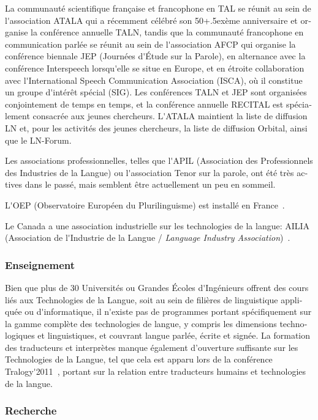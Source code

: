 \documentclass[]{../metanetpaper}
\begin{document}
\begin{french}
\begin{multicols}{2}
La communauté scientifique française et francophone en TAL se réunit
au sein de l{\mbox '}association ATALA qui a récemment célébré son
50\raise+.5ex\hbox{ème} anniversaire et organise la conférence
annuelle TALN, tandis que la communauté francophone en communication
parlée se réunit au sein de l{\mbox '}association AFCP qui organise la
conférence biennale JEP (Journées d{\mbox '}Étude sur la Parole), en
alternance avec la conférence Interspeech lorsqu{\mbox '}elle se situe en
Europe, et en étroite collaboration avec l{\mbox '}International Speech
Communication Association (ISCA), où il constitue un groupe d{\mbox '}intérêt
spécial (SIG). Les conférences TALN et JEP sont organisées
conjointement de temps en temps, et la conférence annuelle RECITAL est
spécialement consacrée aux jeunes chercheurs. L{\mbox '}ATALA maintient la
liste de diffusion LN et, pour les activités des jeunes chercheurs, la
liste de diffusion Orbital, ainsi que le LN-Forum.

Les associations professionnelles, telles que l{\mbox '}APIL (Association des
Professionnels des Industries de la Langue) ou l{\mbox '}association Tenor sur
la parole, ont été très actives dans le passé, mais semblent être
actuellement un peu en sommeil.

L{\mbox '}OEP (Observatoire Européen du Plurilinguisme) est installé en France~\cite{OEP}.

Le Canada a une association industrielle sur les technologies de la langue: AILIA
(Association de l{\mbox '}Industrie de la Langue / {\em Language Industry
Association})~\cite{ailia}.

\subsubsection{Enseignement}
Bien que plus de 30 Universités ou Grandes Écoles d{\mbox '}Ingénieurs
offrent des cours liés aux Technologies de la Langue, soit au sein de
filières de linguistique appliquée ou d{\mbox '}informatique, il
n{\mbox '}existe pas de programmes portant spécifiquement sur la gamme
complète des technologies de langue, y compris les dimensions
technologiques et linguistiques, et couvrant langue parlée, écrite et
signée. La formation des traducteurs et interprètes manque également
d'ouverture suffisante sur les Technologies de la Langue, tel que cela
est apparu lors de la conférence Tralogy{\mbox '}2011~\cite{tralogy},
portant sur la relation entre traducteurs humains et technologies de
la langue.

\subsubsection{Recherche}


\end{multicols}
\end{french}
\end{document}
